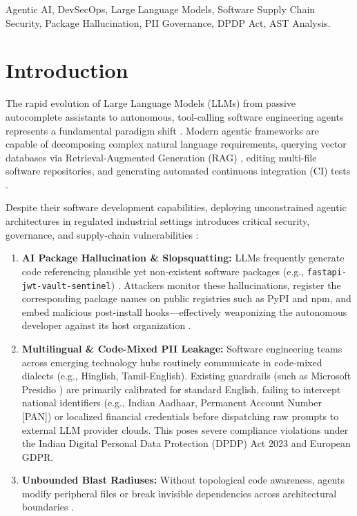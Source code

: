 \documentclass[conference]{IEEEtran}
\begin{document}
\begin{IEEEkeywords}
Agentic AI, DevSecOps, Large Language Models, Software Supply Chain Security, Package Hallucination, PII Governance, DPDP Act, AST Analysis.
\end{IEEEkeywords}

\section{Introduction}
The rapid evolution of Large Language Models (LLMs) from passive autocomplete assistants to autonomous, tool-calling software engineering agents represents a fundamental paradigm shift \cite{jimenez2024swebench, chen2021evaluating}. Modern agentic frameworks are capable of decomposing complex natural language requirements, querying vector databases via Retrieval-Augmented Generation (RAG) \cite{lewis2020rag}, editing multi-file software repositories, and generating automated continuous integration (CI) tests \cite{yao2023react, shinn2024reflexion}.

Despite their software development capabilities, deploying unconstrained agentic architectures in regulated industrial settings introduces critical security, governance, and supply-chain vulnerabilities \cite{pearce2022asleep, owasp2025top10llm}:

\begin{enumerate}
    \item \textbf{AI Package Hallucination \& Slopsquatting:} LLMs frequently generate code referencing plausible yet non-existent software packages (e.g., \texttt{fastapi-jwt-vault-sentinel}) \cite{wu2024slopsquatting}. Attackers monitor these hallucinations, register the corresponding package names on public registries such as PyPI and npm, and embed malicious post-install hooks—effectively weaponizing the autonomous developer against its host organization \cite{ladisa2023supplychain}.
    \item \textbf{Multilingual \& Code-Mixed PII Leakage:} Software engineering teams across emerging technology hubs routinely communicate in code-mixed dialects (e.g., Hinglish, Tamil-English). Existing guardrails (such as Microsoft Presidio \cite{presidio2023microsoft}) are primarily calibrated for standard English, failing to intercept national identifiers (e.g., Indian Aadhaar, Permanent Account Number [PAN]) or localized financial credentials before dispatching raw prompts to external LLM provider clouds. This poses severe compliance violations under the Indian Digital Personal Data Protection (DPDP) Act 2023 \cite{dpdp2023act} and European GDPR.
    \item \textbf{Unbounded Blast Radiuses:} Without topological code awareness, agents modify peripheral files or break invisible dependencies across architectural boundaries \cite{wan2019does}.
\end{enumerate}
\end{document}
